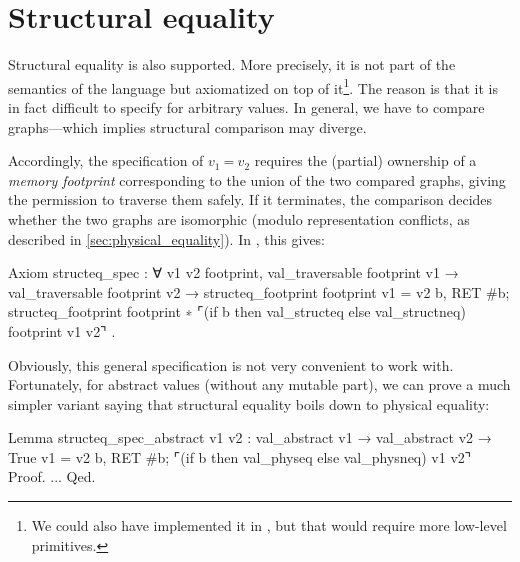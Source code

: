 \section{Structural equality}
\label{sec:structural_equality}

Structural equality is also supported.
More precisely, it is not part of the semantics of the language but axiomatized on top of it\footnote{We could also have implemented it in \ZooLang, but that would require more low-level primitives.}.
The reason is that it is in fact difficult to specify for arbitrary values.
In general, we have to compare graphs---which implies structural comparison may diverge.

Accordingly, the specification of $v_1\ \texttt{=}\ v_2$ requires the (partial) ownership of a \emph{memory footprint} corresponding to the union of the two compared graphs, giving the permission to traverse them safely.
If it terminates, the comparison decides whether the two graphs are isomorphic (modulo representation conflicts, as described in \cref{sec:physical_equality}).
In \Iris, this gives:

\begin{coqcode}
Axiom structeq_spec : ∀ v1 v2 footprint,
  val_traversable footprint v1 →
  val_traversable footprint v2 →
  {{{ structeq_footprint footprint }}}
    v1 = v2
  {{{ b, RET #b;
      structeq_footprint footprint ∗
      ⌜(if b then val_structeq else val_structneq) footprint v1 v2⌝ }}}.
\end{coqcode}

Obviously, this general specification is not very convenient to work with.
Fortunately, for abstract values (without any mutable part), we can prove a much simpler variant saying that structural equality boils down to physical equality:

\begin{coqcode}
Lemma structeq_spec_abstract v1 v2 :
  val_abstract v1 →
  val_abstract v2 →
  {{{ True }}}
    v1 = v2
  {{{ b, RET #b; ⌜(if b then val_physeq else val_physneq) v1 v2⌝ }}}
Proof. ... Qed.
\end{coqcode}
